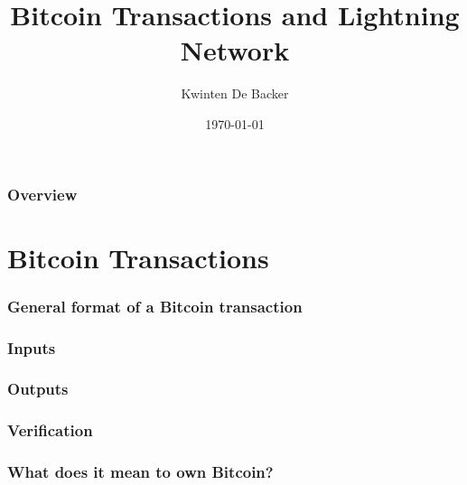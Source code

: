 \documentclass{beamer}
\title[Lightning Network]{Bitcoin Transactions and Lightning Network} %
\author{Kwinten De Backer} %
\date{\today} %
\begin{document}
\begin{frame}
\titlepage %
\end{frame}

\begin{frame}
\frametitle{Overview} %
\tableofcontents %
\end{frame}


\section{Bitcoin Transactions} %

\begin{frame}
\frametitle{General format of a Bitcoin transaction}

\end{frame}

\begin{frame}
\frametitle{Inputs}
\end{frame}

\begin{frame}
\frametitle{Outputs}
\end{frame}

\begin{frame}
\frametitle{Verification}
\end{frame}

\begin{frame}
\frametitle{What does it mean to own Bitcoin?}


\end{frame}
\end{document}
